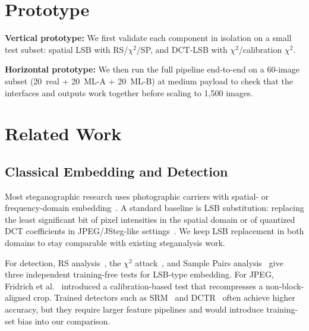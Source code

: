 \documentclass[10pt,twocolumn,a4paper]{article}
\begin{document}
\section{Prototype}

\textbf{Vertical prototype:} We first validate each component in isolation on a small test subset: spatial LSB with RS/$\chi^2$/SP, and DCT-LSB with $\chi^2$/calibration $\chi^2$.

\textbf{Horizontal prototype:} We then run the full pipeline end-to-end on a 60-image subset (20~real + 20~ML-A + 20~ML-B) at medium payload to check that the interfaces and outputs work together before scaling to 1{,}500 images.

\section{Related Work}
\label{sec:relatedwork}

\subsection{Classical Embedding and Detection}
Most steganographic research uses photographic carriers with spatial- or frequency-domain embedding~\cite{petitcolas1999,hussain2018}. A standard baseline is LSB substitution: replacing the least significant bit of pixel intensities in the spatial domain or of quantized DCT coefficients in JPEG/JSteg-like settings~\cite{westfeld1999chi,fridrich2003calib}. We keep LSB replacement in both domains to stay comparable with existing steganalysis work.

For detection, RS analysis~\cite{fridrich2001lsb}, the $\chi^2$ attack~\cite{westfeld1999chi}, and Sample Pairs analysis~\cite{dumitrescu2003sp} give three independent training-free tests for LSB-type embedding. For JPEG, Fridrich et al.~\cite{fridrich2003calib} introduced a calibration-based test that recompresses a non-block-aligned crop. Trained detectors such as SRM~\cite{fridrich2012srm} and DCTR~\cite{holub2015dctr} often achieve higher accuracy, but they require larger feature pipelines and would introduce training-set bias into our comparison.
\end{document}

